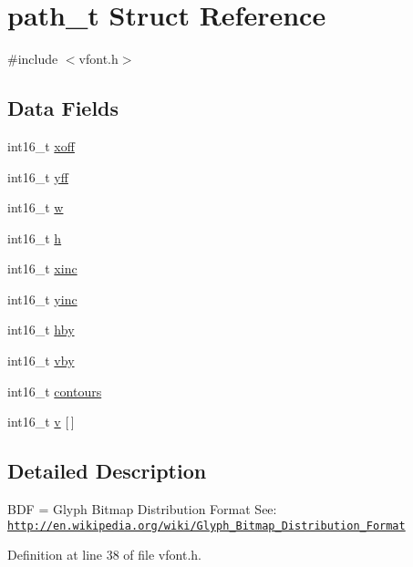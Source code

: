 \hypertarget{structpath__t}{}\section{path\+\_\+t Struct Reference}
\label{structpath__t}


{\ttfamily \#include $<$vfont.\+h$>$}

\subsection*{Data Fields}
\begin{DoxyCompactItemize}
\item 
int16\+\_\+t \hyperlink{structpath__t_afe950c04d6d3082639bd97b53f0f4b41}{xoff}
\item 
int16\+\_\+t \hyperlink{structpath__t_a208b1e1aa60b621e3632cc28d0b4f14b}{yff}
\item 
int16\+\_\+t \hyperlink{structpath__t_a8977017efd250c8fd0eb168f44c618eb}{w}
\item 
int16\+\_\+t \hyperlink{structpath__t_a02d29349ef48169495440a754cad078f}{h}
\item 
int16\+\_\+t \hyperlink{structpath__t_a88d6e591604a22ee9bd48f014fc6585c}{xinc}
\item 
int16\+\_\+t \hyperlink{structpath__t_a224367f52f511bef405c7579240f55d1}{yinc}
\item 
int16\+\_\+t \hyperlink{structpath__t_ab2a7d0842a1706edb85f5bef4300a059}{hby}
\item 
int16\+\_\+t \hyperlink{structpath__t_a3e3a916459dda0710dd252e541fbd372}{vby}
\item 
int16\+\_\+t \hyperlink{structpath__t_a9a9cee636fe5ce261fab53ef94064529}{contours}
\item 
int16\+\_\+t \hyperlink{structpath__t_aea933e3d574931ef4c35386a2b2b8c03}{v} \mbox{[}$\,$\mbox{]}
\end{DoxyCompactItemize}


\subsection{Detailed Description}
B\+DF = Glyph Bitmap Distribution Format See\+: \href{http://en.wikipedia.org/wiki/Glyph_Bitmap_Distribution_Format}{\tt http\+://en.\+wikipedia.\+org/wiki/\+Glyph\+\_\+\+Bitmap\+\_\+\+Distribution\+\_\+\+Format} 

Definition at line 38 of file vfont.\+h.



